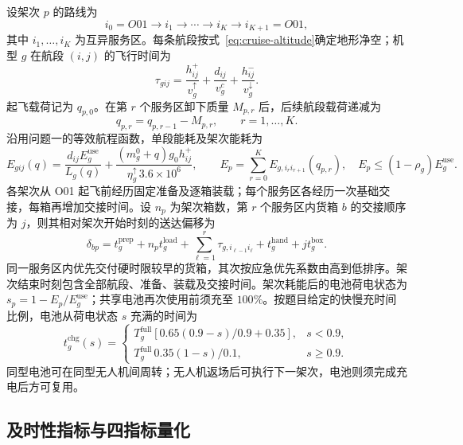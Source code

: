 \documentclass[bwprint,fontset=windows]{gmcmthesis}
\begin{document}
设架次 $p$ 的路线为
\[
i_0=O01\to i_1\to\cdots\to i_K\to i_{K+1}=O01,
\]
其中 $i_1,\ldots,i_K$ 为互异服务区。每条航段按式~\eqref{eq:cruise-altitude}确定地形净空；机型 $g$ 在航段 $(i,j)$ 的飞行时间为
\begin{equation}
\tau_{gij}=\frac{h_{ij}^{+}}{v_g^\uparrow}
+\frac{d_{ij}}{v_g^c}
+\frac{h_{ij}^{-}}{v_g^\downarrow}.
\label{eq:q2-leg-time}
\end{equation}
起飞载荷记为 $q_{p,0}$。在第 $r$ 个服务区卸下质量 $M_{p,r}$ 后，后续航段载荷递减为
\[
q_{p,r}=q_{p,r-1}-M_{p,r},\qquad r=1,\ldots,K.
\]
沿用问题一的等效航程函数，单段能耗及架次能耗为
\begin{equation}
E_{gij}(q)=\frac{d_{ij}E_g^{\mathrm{use}}}{L_g(q)}
+\frac{(m_g^0+q)g_0h_{ij}^{+}}{\eta_g^\uparrow\,3.6\times10^6},
\qquad
E_p=\sum_{r=0}^{K}E_{g,i_r i_{r+1}}(q_{p,r}),
\quad
E_p\le(1-\rho_g)E_g^{\mathrm{use}} .
\label{eq:q2-leg-energy}
\end{equation}
各架次从 O01 起飞前经历固定准备及逐箱装载；每个服务区各经历一次基础交接，每箱再增加交接时间。设 $n_p$ 为架次箱数，第 $r$ 个服务区内货箱 $b$ 的交接顺序为 $j$，则其相对架次开始时刻的送达偏移为
\begin{equation}
\delta_{bp}=t_g^{\mathrm{prep}}+n_p t_g^{\mathrm{load}}
+\sum_{\ell=1}^{r}\tau_{g,i_{\ell-1}i_\ell}
+t_g^{\mathrm{hand}}+j t_g^{\mathrm{box}} .
\label{eq:q2-delivery-offset}
\end{equation}
同一服务区内优先交付硬时限较早的货箱，其次按应急优先系数由高到低排序。架次结束时刻包含全部航段、准备、装载及交接时间。架次耗能后的电池荷电状态为 $s_p=1-E_p/E_g^{\mathrm{use}}$；共享电池再次使用前须充至 $100\%$。按题目给定的快慢充时间比例，电池从荷电状态 $s$ 充满的时间为
\begin{equation}
t_g^{\mathrm{chg}}(s)=
\begin{cases}
T_g^{\mathrm{full}}\left[0.65(0.9-s)/0.9+0.35\right],&s<0.9,\\
T_g^{\mathrm{full}}\,0.35(1-s)/0.1,&s\ge0.9.
\end{cases}
\label{eq:q2-charge-time}
\end{equation}
同型电池可在同型无人机间周转；无人机返场后可执行下一架次，电池则须完成充电后方可复用。

\subsection{及时性指标与四指标量化}
\end{document}
